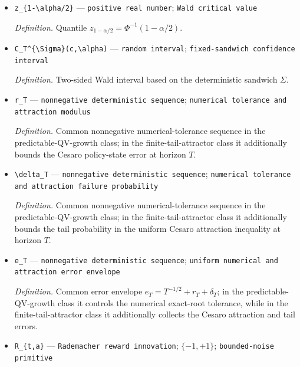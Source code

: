 \documentclass{article}
\begin{document}
\begin{itemize}
  \par\smallskip\noindent\emph{Definition.} \texttt{Standard normal distribution function.}
  \item \texttt{z\_\allowbreak{}\{1-\allowbreak{}\textbackslash{}\allowbreak{}alpha/\allowbreak{}2\}\allowbreak{}} --- \texttt{positive real number}; \texttt{Wald critical value}
  \par\smallskip\noindent\emph{Definition.} Quantile \(z_{1-\alpha/2}=\Phi^{-1}(1-\alpha/2)\).
  \item \texttt{C\_\allowbreak{}T\textasciicircum{}\{\textbackslash{}\allowbreak{}Sigma\}\allowbreak{}(c,\allowbreak{}\textbackslash{}\allowbreak{}alpha)} --- \texttt{random interval}; \texttt{fixed-\allowbreak{}sandwich confidence interval}
  \par\smallskip\noindent\emph{Definition.} Two-sided Wald interval based on the deterministic sandwich \(\Sigma\).
  \item \texttt{r\_\allowbreak{}T} --- \texttt{nonnegative deterministic sequence}; \texttt{numerical tolerance and attraction modulus}
  \par\smallskip\noindent\emph{Definition.} Common nonnegative numerical-tolerance sequence in the predictable-QV-growth class; in the finite-tail-attractor class it additionally bounds the Cesaro policy-state error at horizon \(T\).
  \item \texttt{\textbackslash{}\allowbreak{}delta\_\allowbreak{}T} --- \texttt{nonnegative deterministic sequence}; \texttt{numerical tolerance and attraction failure probability}
  \par\smallskip\noindent\emph{Definition.} Common nonnegative numerical-tolerance sequence in the predictable-QV-growth class; in the finite-tail-attractor class it additionally bounds the tail probability in the uniform Cesaro attraction inequality at horizon \(T\).
  \item \texttt{e\_\allowbreak{}T} --- \texttt{nonnegative deterministic sequence}; \texttt{uniform numerical and attraction error envelope}
  \par\smallskip\noindent\emph{Definition.} Common error envelope \(e_T=T^{-1/2}+r_T+\delta_T\); in the predictable-QV-growth class it controls the numerical exact-root tolerance, while in the finite-tail-attractor class it additionally collects the Cesaro attraction and tail errors.
  \item \texttt{R\_\allowbreak{}\{t,\allowbreak{}a\}\allowbreak{}} --- \texttt{Rademacher reward innovation}; \(\{-1,+1\}\); \texttt{bounded-\allowbreak{}noise primitive}

\end{itemize}
\end{document}
